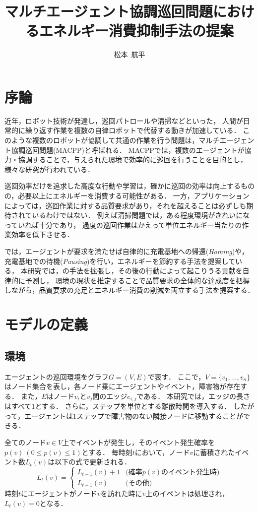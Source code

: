 \documentclass[11pt,a4j,twocolumn]{jarticle}
\title{マルチエージェント協調巡回問題におけるエネルギー消費抑制手法の提案}
\author{松本~航平}
\begin{document}
\maketitle
\section{序論}
近年，ロボット技術が発達し，巡回パトロールや清掃などといった，
人間が日常的に繰り返す作業を複数の自律ロボットで代替する動きが加速している．
このような複数のロボットが協調して共通の作業を行う問題は，マルチエージェント協調巡回問題(MACPP)と呼ばれる．
MACPPでは，複数のエージェントが協力・協調することで，与えられた環境で効率的に巡回を行うことを目的とし，
様々な研究が行われている\cite{Yoneda2013,Wu2019}．
\par

巡回効率だけを追求した高度な行動や学習は，確かに巡回の効率は向上するものの，必要以上にエネルギーを消費する可能性がある．
一方，アプリケーションによっては，巡回作業に対する品質要求があり，それを超えることは必ずしも期待されているわけではない．
例えば清掃問題では，ある程度環境がきれいになっていれば十分であり，
過度の巡回作業はかえって単位エネルギー当たりの作業効率を低下させる．
\par

\cite{Wu2019}では，エージェントが要求を満たせば自律的に充電基地への帰還({\em Homing})や，
充電基地での待機({\em Pausing})を行い，エネルギーを節約する手法を提案している，
本研究では，\cite{Wu2019}の手法を拡張し，その後の行動によって起こりうる貢献を自律的に予測し，
環境の現状を推定することで品質要求の全体的な達成度を把握しながら，品質要求の充足とエネルギー消費の削減を両立する手法を提案する．

\section{モデルの定義}
\subsection{環境}
エージェントの巡回環境をグラフ$G = (V,E)$で表す．
ここで，$V = \{v_1, \dots, v_n \}$はノード集合を表し，各ノード乗にエージェントやイベント，障害物が存在する．
また，$E$はノード$v_i$と$v_j$間のエッジ$e_{i,j}$である．
本研究では，エッジの長さはすべて1とする．
さらに，ステップを単位とする離散時間を導入する．
したがって，エージェントは1ステップで障害物のない隣接ノードに移動することができる．
\par

全てのノード$v\in V$上でイベントが発生し，そのイベント発生確率を$p(v)~(0\leq p(v)\leq 1)$とする．
毎時刻$t$において，ノード$v$に蓄積されたイベント数$L_t(v)$は以下の式で更新される．
%
\[
  L_t(v) = \left\{
\begin{array}{ll}
  L_{t-1}(v) + 1 & \textrm{(確率$p(v)$のイベント発生時)} \\
  L_{t-1}(v) & \textrm{(その他)}
\end{array}
\right.  
\]
%
時刻$t$にエージェントがノード$v$を訪れた時に$v$上のイベントは処理され，$L_t(v) = 0$となる．
\end{document}
